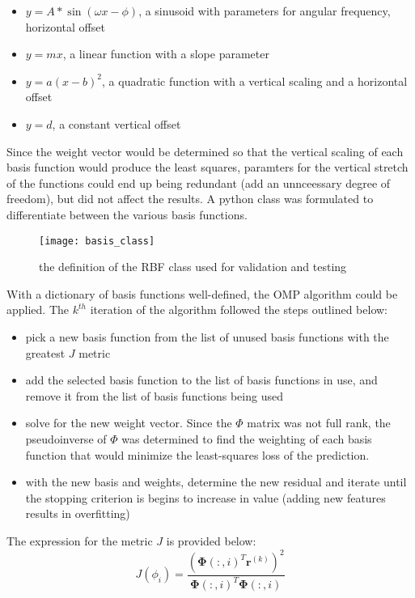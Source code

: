 \documentclass{article}
\begin{document}
\begin{itemize}
\item $y=A * \sin(\omega x - \phi)$, a sinusoid with parameters for angular frequency, horizontal offset
\item $ y=mx$, a linear function with a slope parameter
\item $ y=a (x - b)^2$, a quadratic function with a vertical scaling and a horizontal offset
\item $ y=d$, a constant vertical offset
\end{itemize}

Since the weight vector would be determined so that the vertical scaling of each basis function would produce the least squares, paramters for the vertical stretch of the functions could end up being redundant (add an unnceessary degree of freedom), but did not affect the results. A python class was formulated to differentiate between the various basis functions.

\begin{figure}[H]
\centering
\texttt{[image: basis\_class]}
\caption{the definition of the RBF class used for validation and testing}
\end{figure}

With a dictionary of basis functions well-defined, the OMP algorithm could be applied. The $k^{th}$ iteration of the algorithm followed the steps outlined below:

\begin{itemize}
\item pick a new basis function from the list of unused basis functions with the greatest $J$ metric
\item add the selected basis function to the list of basis functions in use, and remove it from the list of basis functions being used
\item solve for the new weight vector. Since the $\Phi$ matrix was not full rank, the pseudoinverse of $\Phi$ was determined to find the weighting of each basis function that would minimize the least-squares loss of the prediction.
\item with the new basis and weights, determine the new residual and iterate until the stopping criterion is begins to increase in value (adding new features results in overfitting)
\end{itemize}

The expression for the metric $J$ is provided below:
\begin{equation}
J(\phi_i) = \frac{(\mathbf{\Phi}(:,i)^T\mathbf{r}^{(k)})^2}{\mathbf{\Phi}(:,i)^T\mathbf{\Phi}(:,i)}
\end{equation}
\end{document}
